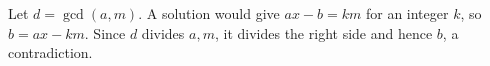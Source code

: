 Let $d=\gcd(a,m)$. A solution would give $ax-b=km$ for an integer $k$, so $b=ax-km$. Since $d$ divides $a,m$, it divides the right side and hence $b$, a contradiction.
